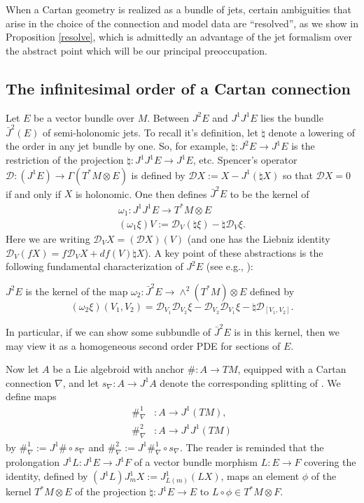 \documentclass[leqno,12pt]{amsart} %
\begin{document}
When a Cartan geometry is realized as a bundle of jets, certain ambiguities that arise in
the choice of the connection and model data are ``resolved'', as we show in Proposition
\ref{resolve}, which is admittedly an advantage of the jet formalism over the abstract
point which will be our principal preoccupation.

\subsection{The infinitesimal order of a Cartan connection}\label{infinitesimal_order}
Let $E$ be a vector bundle over $M$. Between $J^2E$ and $J^1 J^1 E$ lies the bundle
$\bar J^2(E)$ of {\df semi-holonomic} jets. To recall it's definition, let $\natural$
denote a lowering of the order in any jet bundle by one. So, for example,
$\natural \colon J^2E \rightarrow J^1E$ is the restriction of the projection
$\natural \colon J^1 J^1 E \rightarrow J^1 E$, etc. {\df Spencer's operator}
${\mathcal D} \colon (J^1E) \rightarrow \Gamma(T^*\!M \otimes E)$ is defined by
${\mathcal D} X := X - J^1(\natural X)$ so that ${\mathcal D} X=0$ if and only if $X$ is
holonomic. One then defines $\bar J^2E$ to be the kernel of
\begin{gather*}
  \omega_1 \colon J^1 J^1 E \rightarrow T^*\!M \otimes E\\
(\omega_1 \xi)V:={\mathcal D}_V(\natural \xi) - \natural {\mathcal D}_V \xi.
\end{gather*}
Here we are writing ${\mathcal D}_VX = ({\mathcal D} X)(V)$ (and one has the Liebniz
identity ${\mathcal D}_V(fX) = f {\mathcal D}_VX + df(V)\natural X$). A key point of these
abstractions is the following fundamental characterization of $J^2E$ (see e.g.,
\cite[\S8.1]{Blaom_12}):

\begin{lemma}
  $J^2E$ is the kernel of the map
  $\omega_2 \colon \bar J^2 E \rightarrow \wedge^2(T^*\!M)\otimes E $ defined
  by
  $$(\omega_2 \xi)(V_1, V_2) = {\mathcal D}_{V_1}{\mathcal D}_{V_2}\xi - {\mathcal
    D}_{V_2}{\mathcal D}_{V_1}\xi - \natural {\mathcal D}_{[V_1,V_2]}.$$
\end{lemma}
\noindent%
In particular, if we can show some subbundle of $\bar J^2E$ is in this kernel, then we may
view it as a homogeneous second order PDE for sections of $E$.

Now let $A$ be a Lie algebroid with anchor $\# \colon A \rightarrow TM$, equipped with a
Cartan connection $\nabla $, and let $s_\nabla \colon A \rightarrow J^1 A$ denote the
corresponding splitting of . We define maps
\begin{align*}
\#_\nabla^1 &\colon A \rightarrow J^1 (TM),\\
\#_\nabla^2&\colon A \rightarrow J^1 J^1 (TM)
\end{align*}
by $\#_\nabla^1 := J^1\# \circ s_\nabla$ and
$\#_\nabla^2 := J^1\#_\nabla^1 \circ s_\nabla$. The reader is reminded that the
prolongation $J^1 L \colon J^1 E \rightarrow J^1 F$ of a vector bundle morphism
$L\colon E \rightarrow F$ covering the identity, defined by
$(J^1L)J^1_mX := J^1_{L(m)}(LX)$, maps an element $\phi $ of the kernel $T^*\!M \otimes E$
of the projection $\natural \colon J^1 E \rightarrow E $ to
$L \circ \phi \in T^*\!M \otimes F$.
\end{document}
